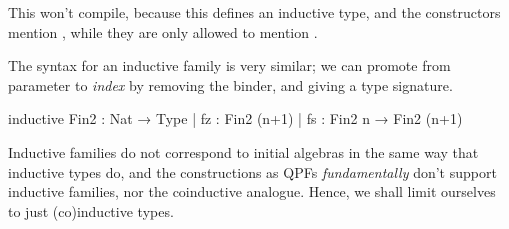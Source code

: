 This won't compile, because this defines an inductive type, and the constructors mention , while they are only allowed to mention .

The syntax for an inductive family is very similar; we can promote  from parameter to \emph{index} by removing the binder, and giving a type signature.

\begin{leancode}
    inductive Fin2 : Nat → Type
    | fz : Fin2 (n+1)
    | fs : Fin2 n → Fin2 (n+1)
\end{leancode}

Inductive families do not correspond to initial algebras in the same way that inductive types do, and the constructions as QPFs \emph{fundamentally} don't support inductive families, nor the coinductive analogue.
Hence, we shall limit ourselves to just (co)inductive types.
